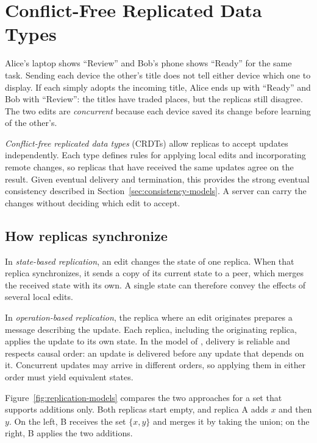 \section{Conflict-Free Replicated Data Types}
\label{sec:conflict-free-replicated-data-types}

Alice's laptop shows \enquote{Review} and Bob's phone shows \enquote{Ready} for the same task.
Sending each device the other's title does not tell either device which one to display.
If each simply adopts the incoming title, Alice ends up with \enquote{Ready} and Bob with \enquote{Review}: the titles have traded places, but the replicas still disagree.
The two edits are \emph{concurrent} because each device saved its change before learning of the other's.

\emph{Conflict-free replicated data types} (CRDTs) allow replicas to accept updates independently.
Each type defines rules for applying local edits and incorporating remote changes, so replicas that have received the same updates agree on the result.
Given eventual delivery and termination, this provides the strong eventual consistency described in Section~\ref{sec:consistency-models}.
A server can carry the changes without deciding which edit to accept.
\parencite[1--2]{crdt-overview}

\subsection{How replicas synchronize}

In \emph{state-based replication}, an edit changes the state of one replica.
When that replica synchronizes, it sends a copy of its current state to a peer, which merges the received state with its own.
A single state can therefore convey the effects of several local edits.
\parencite[Section~2.1]{conflict-free-replicated-data-types}

In \emph{operation-based replication}, the replica where an edit originates prepares a message describing the update.
Each replica, including the originating replica, applies the update to its own state.
In the model of \textcite[Section~2.4]{conflict-free-replicated-data-types}, delivery is reliable and respects causal order: an update is delivered before any update that depends on it.
Concurrent updates may arrive in different orders, so applying them in either order must yield equivalent states.

Figure~\ref{fig:replication-models} compares the two approaches for a set that supports additions only.
Both replicas start empty, and replica A adds \(x\) and then \(y\).
On the left, B receives the set \(\{x,y\}\) and merges it by taking the union; on the right, B applies the two additions.

